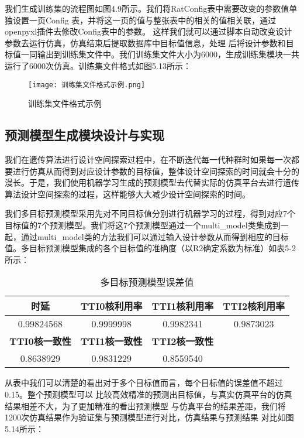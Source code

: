 我们生成训练集的流程图如图4.9所示。我们将RatConfig表中需要改变的参数值单独设置一页Config
表，并将这一页的值与整张表中的相关的值相关联，通过openpyxl插件去修改Config表中的参数。
这样我们就可以通过脚本自动改变设计参数去运行仿真，仿真结束后提取数据库中目标值信息，处理
后将设计参数和目标值一同输出到训练集文件中。我们训练集文件大小为6000，生成训练集模块一共
运行了6000次仿真。训练集文件格式如图5.13所示：

\begin{figure}
    \centering
    \texttt{[image: 训练集文件格式示例.png]}
    \caption{训练集文件格式示例}
    \label{fig:badge}
\end{figure}

\subsection{预测模型生成模块设计与实现}

我们在遗传算法进行设计空间探索过程中，在不断迭代每一代种群时如果每一次都要进行仿真从而得到对应设计参数的目标值，整体设计空间探索的时间就会十分的漫长。于是，我们使用机器学习生成的预测模型去代替实际的仿真平台去进行遗传算法设计空间探索的过程，这样能够大大减少设计空间探索的时间。

我们多目标预测模型采用先对不同目标值分别进行机器学习的过程，得到对应7个目标值的7个预测模型。我们将这7个预测模型通过一个multi\_model类集成到一起，通过multi\_model类的方法我们可以通过输入设计参数从而得到相应的目标值。多目标预测模型集成的各个目标值的准确度（以R2确定系数为标准）如表5-2所示：

\begin{table}[!h]
    \centering\normalsize
    \caption{多目标预测模型误差值}
    \begin{tabular}{|c|c|c|c|}
    \hline
    \textbf{时延}       & \textbf{TTI0核利用率} & \textbf{TTI1核利用率} & \textbf{TTI2核利用率} \\ \hline
    0.99824568        & 0.9999998         & 0.9982341         & 0.9873023         \\ \hline
    \textbf{TTI0核一致性} & \textbf{TTI1核一致性} & \textbf{TTI2核一致性} & \textbf{}         \\ \hline
    0.8638929         & 0.9831229         & 0.8559540         &                   \\ \hline
    \end{tabular}
    \end{table}

从表中我们可以清楚的看出对于多个目标值而言，每个目标值的误差值不超过0.15。整个预测模型可以
比较高效精准的预测出目标值，与真实仿真平台的仿真结果相差不大，为了更加精准的看出预测模型
与仿真平台的结果差距，我们将1200次仿真结果作为验证集与预测模型进行对比，仿真结果与预测结果
对比如图5.14所示：


